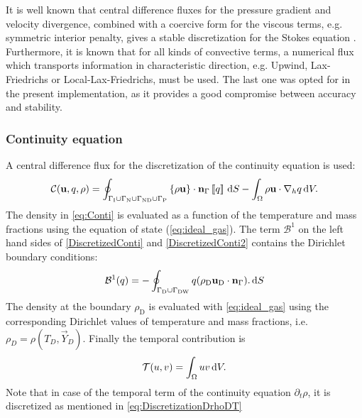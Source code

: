 It is well known that central difference fluxes for the pressure gradient and velocity divergence, combined with a coercive form for the viscous terms, e.g. symmetric interior penalty, gives a stable discretization for the Stokes equation \parencite{pietroMathematicalAspectsDiscontinuous2012,giraultDiscontinuousGalerkinMethod2004}. Furthermore, it is known that for all kinds of convective terms, a numerical flux which transports information in characteristic direction, e.g. Upwind, Lax-Friedrichs or Local-Lax-Friedrichs, must be used. The last one was opted for in the present implementation, as it provides a good compromise between accuracy and stability.
\subsubsection{Continuity equation}
A central difference flux for the discretization of the continuity equation is used:
\begin{equation}
	\mathcal{C}(\textbf{u},q, \rho)  =  \oint_{\Gamma_{\text{I}} \cup\Gamma_{\text{N}}\cup \Gamma_{\text{ND}}\cup \Gamma_{\text{P}}}{\left\{{\rho\textbf{u} }\right\}\cdot \textbf{n}_\Gamma\left[\!\left[{{q}}\right]\!\right] \,\mathrm{d} S} - \int_{\Omega}{\rho \textbf{u}\cdot \nabla_h q} \,\mathrm{d} V.  \label{eq:Conti}
\end{equation}
The density in \cref{eq:Conti} is evaluated as a function of the temperature and mass fractions using the equation of state (\cref{eq:ideal_gas}). The term $\mathcal{B}^1$ on the left hand sides of \cref{DiscretizedConti} and \cref{DiscretizedConti2}  contains the Dirichlet boundary conditions:
\begin{equation}
	\mathcal{B}^1(q) =  -\oint_{\Gamma_{\text{D}}\cup \Gamma_{\text{DW}}}{q(\rho_{\text{D}} \textbf{u}_{\text{D}} \cdot \textbf{n}_{\Gamma}). \,\mathrm{d} S}
\end{equation}
The density at the boundary  $\rho_{\text{D}}$ is evaluated with \cref{eq:ideal_gas} using the corresponding Dirichlet values of temperature and mass fractions, i.e. $\rho_D = \rho (T_D,\vec{Y}_D)$. Finally the temporal contribution is
\begin{equation}
\mathcal{T}(u,v) =   \int_{\Omega}{uv} \,\mathrm{d} V.
\end{equation}
Note that in case of the temporal term of the continuity equation $\partial_t \rho$, it is discretized as mentioned in \cref{eq:DiscretizationDrhoDT}
